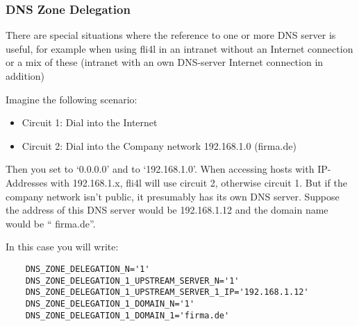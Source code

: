 \subsubsection{DNS Zone Delegation}

  \begin{description}


    { There are special situations where the reference to one or more
       DNS server is useful, for example when using fli4l in an intranet
       without an Internet connection or a mix of these (intranet with
       an own DNS-server Internet connection in addition)

      Imagine the following scenario:

      \begin{itemize}
      \item Circuit 1: Dial into the Internet
      \item Circuit 2: Dial into the Company network 192.168.1.0 (firma.de)
      \end{itemize}


      Then you set  to `0.0.0.0' and
       to `192.168.1.0'. When accessing
      hosts with IP-Addresses with 192.168.1.x, fli4l will use circuit
      2, otherwise circuit 1. But if the company network isn't public,
      it presumably has its own DNS server. Suppose the address of this
      DNS server would be 192.168.1.12 and the domain name would be
      `` firma.de''.

      In this case you will write:

\begin{example}
\begin{verbatim}
    DNS_ZONE_DELEGATION_N='1'
    DNS_ZONE_DELEGATION_1_UPSTREAM_SERVER_N='1'
    DNS_ZONE_DELEGATION_1_UPSTREAM_SERVER_1_IP='192.168.1.12'
    DNS_ZONE_DELEGATION_1_DOMAIN_N='1'
    DNS_ZONE_DELEGATION_1_DOMAIN_1='firma.de'
\end{verbatim}
\end{example}

}
\end{description}
